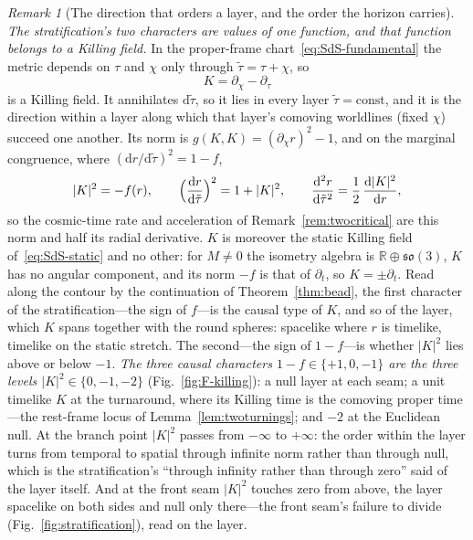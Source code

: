 \documentclass[11pt,a4paper]{article}
\theoremstyle{plain}
\theoremstyle{definition}
\theoremstyle{remark}
\newtheorem{remark}{Remark}
\newcommand{\dd}{\mathrm{d}}
\begin{document}
\begin{remark}[The direction that orders a layer, and the order the horizon carries]\label{rem:killingorder}
\emph{The stratification's two characters are values of one function, and that function belongs to a Killing
field.} In the proper-frame chart~\eqref{eq:SdS-fundamental} the metric depends on $\tau$ and $\chi$ only through
$\tilde\tau=\tau+\chi$, so
\[
K=\partial_\chi-\partial_\tau
\]
is a Killing field. It annihilates $\dd\tilde\tau$, so it lies in every layer $\tilde\tau=\mathrm{const}$, and it is
the direction within a layer along which that layer's comoving worldlines (fixed $\chi$) succeed one another. Its
norm is $g(K,K)=(\partial_\chi r)^2-1$, and on the marginal congruence, where
$(\dd r/\dd\tilde\tau)^2=1-f$,
\[
|K|^2=-f(r),\qquad
\Bigl(\frac{\dd r}{\dd\tilde\tau}\Bigr)^{2}=1+|K|^2,\qquad
\frac{\dd^{2}r}{\dd\tilde\tau^{2}}=\frac12\,\frac{\dd|K|^2}{\dd r},
\]
so the cosmic-time rate and acceleration of Remark~\ref{rem:twocritical} are this norm and half its radial
derivative. $K$ is moreover the static Killing field of~\eqref{eq:SdS-static} and no other: for $M\neq0$ the
isometry algebra is $\mathbb{R}\oplus\mathfrak{so}(3)$, $K$ has no angular component, and its norm $-f$ is that
of $\partial_t$, so $K=\pm\partial_t$. Read along the contour by the continuation of Theorem~\ref{thm:bead}, the
first character of the
stratification---the sign of $f$---is the causal type of $K$, and so of the layer, which $K$ spans together with
the round spheres: spacelike where $r$ is timelike, timelike on the static stretch. The second---the sign of
$1-f$---is whether $|K|^2$ lies above or below $-1$. \emph{The three causal characters $1-f\in\{+1,0,-1\}$ are
the three levels $|K|^2\in\{0,-1,-2\}$} (Fig.~\ref{fig:F-killing}): a null layer at each seam; a unit timelike
$K$ at the turnaround, where its Killing time is the comoving proper time---the rest-frame locus of
Lemma~\ref{lem:twoturnings}; and $-2$ at the Euclidean null. At the branch point $|K|^2$ passes from $-\infty$ to
$+\infty$: the order within the layer turns from temporal to spatial through infinite norm rather than through
null, which is the stratification's ``through infinity rather than through zero'' said of the layer itself. And at
the front seam $|K|^2$ touches zero from above, the layer spacelike on both sides and null only there---the
front seam's failure to divide (Fig.~\ref{fig:stratification}), read on the layer.


\end{remark}
\end{document}
